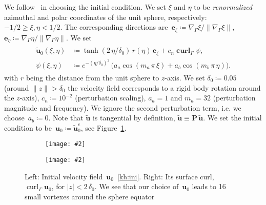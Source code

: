 \documentclass[12pt]{article}
\newcommand{\includegraphicsw}[2][1.]{\texttt{[image: \#2]}}
\newcommand{\vect}[1]{\boldsymbol{\mathbf{#1}}}
\DeclareMathOperator{\Curl}{curl}
\DeclareMathOperator{\vCurl}{\vect{curl}}
\begin{document}
We follow~\cite{lederer2019divergence} in choosing the initial condition. We set $\xi$ and $\eta$ to be \textit{renormalized} azimuthal and polar coordinates of the unit sphere, respectively: $-1/2 \ge \xi, \eta < 1/2$. The corresponding directions are~$\vect e_\xi \coloneqq \nabla_{\Gamma}\xi/\|\nabla_{\Gamma}\xi\|$, $\vect e_\eta \coloneqq \nabla_{\Gamma}\eta/\|\nabla_{\Gamma}\eta\|$. We set
\begin{align}\begin{split} \label{kh:ini}
	\tilde{\vect u}_0(\xi, \eta) &\coloneqq \tanh(2\,\eta/\delta_0)\,r(\eta)\,\vect e_\xi + c_n\vCurl_\Gamma\psi, \\
	\psi(\xi, \eta) &\coloneqq e^{-(\eta/\delta_0)^2}\,\big(a_a\cos(m_a\,\pi\,\xi) + a_b\cos(m_b\,\pi\,\eta)\big).
\end{split}\end{align}
with $r$ being the distance from the unit sphere to $z$-axis. We set $\delta_0 \coloneqq 0.05$ (around $\|z\| > \delta_0$ the velocity field corresponds to a rigid body rotation around the $z$-axis), $c_n \coloneqq 10^{-2}$ (perturbation scaling), $a_a = 1$ and $m_a = 32$ (perturbation magnitude and frequency). We ignore the second perturbation term, i.e. we choose~$a_b \coloneqq 0$. Note that $\tilde{\vect u}$ is tangential by definition, $\tilde{\vect u} \equiv \vect P\,\tilde{\vect u}$. We set the initial condition to be~$\vect u_0 \coloneqq \tilde{\vect u}_0^e$, see Figure~\ref{fig:kh:ini}.

\begin{figure}[H]
	\par\bigskip
	\centering
	\begin{subfigure}{.35\linewidth}
		\centering
		\includegraphicsw[.95]{{kh_ini_u_16.cropped}.png}
	\end{subfigure}%
	\begin{subfigure}{.65\linewidth}
		\centering
		\includegraphicsw[.95]{{kh_ini_w_16.cropped}.png}
	\end{subfigure}%
	\caption{Left: Initial velocity field~$\vect u_0$~\eqref{kh:ini}. Right: Its surface curl, $\Curl_\Gamma \vect u_0$, for $|z| < 2\,\delta_0$. We see that our choice of~$\vect u_0$ leads to 16 small vortexes around the sphere equator}
	\label{fig:kh:ini}		
\end{figure}
\end{document}
